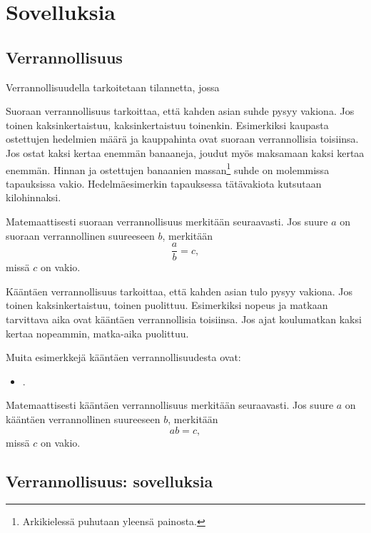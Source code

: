 %
\part{Sovelluksia}
%
%
\chapter{Verrannollisuus}

Verrannollisuudella tarkoitetaan tilannetta, jossa 

Suoraan verrannollisuus tarkoittaa, että kahden asian suhde pysyy vakiona. Jos toinen kaksinkertaistuu, kaksinkertaistuu toinenkin. Esimerkiksi kaupasta ostettujen hedelmien määrä ja kauppahinta ovat suoraan verrannollisia toisiinsa. Jos ostat kaksi kertaa enemmän banaaneja, joudut myös maksamaan kaksi kertaa enemmän. Hinnan ja ostettujen banaanien massan\footnote{Arkikielessä puhutaan yleensä painosta.} suhde on molemmissa tapauksissa vakio. Hedelmäesimerkin tapauksessa tätävakiota kutsutaan kilohinnaksi.

Matemaattisesti suoraan verrannollisuus merkitään seuraavasti. Jos suure $a$ on suoraan verrannollinen suureeseen $b$, merkitään
\begin{equation}
\frac{a}{b}=c,
\end{equation}
missä $c$ on vakio.

Kääntäen verrannollisuus tarkoittaa, että kahden asian tulo pysyy vakiona. Jos toinen kaksinkertaistuu, toinen puolittuu. Esimerkiksi nopeus ja matkaan tarvittava aika ovat kääntäen verrannollisia toisiinsa. Jos ajat koulumatkan kaksi kertaa nopeammin, matka-aika puolittuu.

Muita esimerkkejä kääntäen verrannollisuudesta ovat:
\begin{itemize}
\item .
\end{itemize}

Matemaattisesti kääntäen verrannollisuus merkitään seuraavasti. Jos suure $a$ on kääntäen verrannollinen suureeseen $b$, merkitään
\begin{equation}
ab=c,
\end{equation}
missä $c$ on vakio.


\chapter{Verrannollisuus: sovelluksia}

